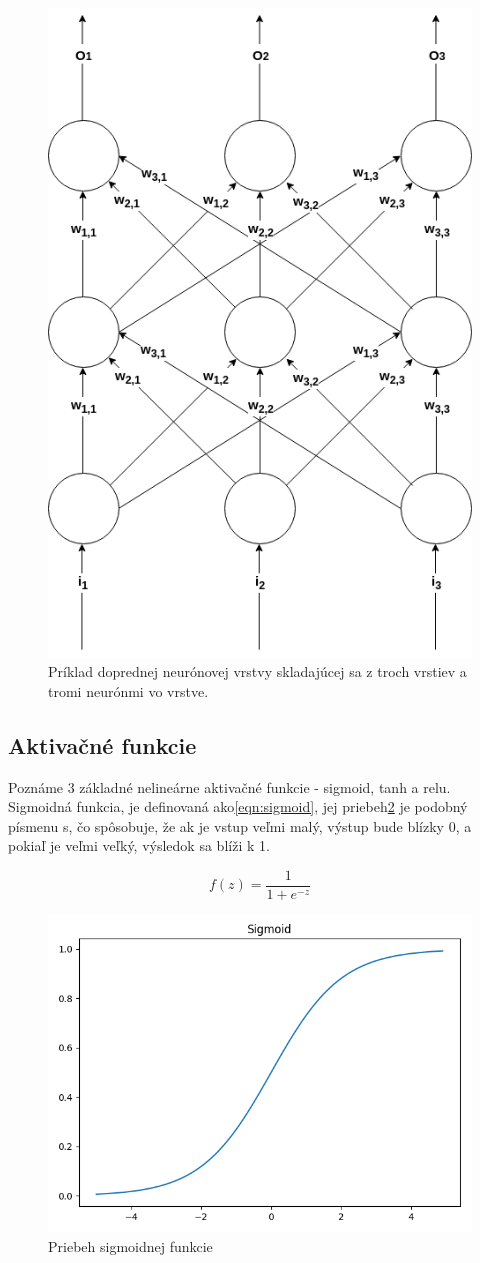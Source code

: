 \begin{figure}[H]
	\centering
	\includegraphics[width=0.5\linewidth]{img/ann}
	\caption{Príklad doprednej neurónovej vrstvy skladajúcej sa z troch vrstiev a tromi neurónmi vo vrstve.}
	\label{fig:ann}
\end{figure}

\subsection{Aktivačné funkcie}
Poznáme 3 základné nelineárne aktivačné funkcie - sigmoid, tanh a relu.
Sigmoidná funkcia, je definovaná ako\eqref{eqn:sigmoid}, jej priebeh\ref{fig:sigmoid} je podobný písmenu s, čo spôsobuje, že ak je vstup veľmi malý, výstup bude blízky 0, a pokiaľ je veľmi veľký, výsledok sa blíži k 1.

\begin{equation}\label{eqn:sigmoid}
f(z) = \frac{1}{1 + e^{-z}}
\end{equation}

\begin{figure}[H]
	\centering
	\includegraphics[width=0.5\linewidth]{img/sigmoid}
	\caption{Priebeh sigmoidnej funkcie}
	\label{fig:sigmoid}
\end{figure}


